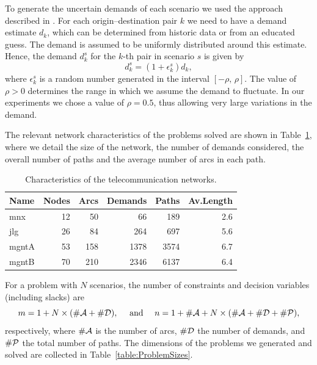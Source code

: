 To generate the uncertain demands of each scenario 
we used the approach described in \cite{Ouorou}. 
For each origin--destination pair $k$ we need to have a demand 
estimate $d_k$, which can be determined from historic data 
or from an educated guess. The demand is assumed to be uniformly 
distributed around this estimate. Hence, the demand $d_k^s$ 
for the $k$-th pair in scenario $s$ is given by
\[
d_k^s = (1+ \epsilon_k^s)d_k,
\]
where $\epsilon_k^s$ is a random number generated in the interval 
$[-\rho, \, \rho]$. The value of $\rho > 0$ determines the range 
in which we assume the demand to fluctuate.
In our experiments we chose a value of $\rho = 0.5$, thus allowing
very large variations in the demand.
%

The relevant network characteristics of the problems solved are shown 
in Table~\ref{table:ProblemData}, where we detail the size of the network, 
the number of demands considered, the overall number of paths and the
average number of arcs in each path.
%
%
%
\begin{table}[ht]
  \begin{center}
    \begin{tabular}{|l||r|r|r|r|r|} \hline
      Name      & Nodes & Arcs & Demands & Paths & Av.Length \\ \hline\hline
      mnx       &    12 &   50 &     66  &   189 & 2.6 \\
      jlg       &    26 &   84 &    264  &   697 & 5.6 \\
      mgntA     &    53 &  158 &   1378  &  3574 & 6.7 \\
      mgntB     &    70 &  210 &   2346  &  6137 & 6.4 \\ \hline
    \end{tabular}
    \caption{Characteristics of the telecommunication networks.}
    \label{table:ProblemData}
  \end{center} \vspace{-3ex}
\end{table}

\noindent For a problem with $N$ scenarios, the number of constraints and 
decision variables (including slacks) are
\[
m = 1 + N \times (\#{\cal A} + \#{\cal D}), \quad \mbox{ and } \quad
n = 1 + \#{\cal A} + N \times (\#{\cal A} + \#{\cal D} + \#{\cal P}),
\]
respectively, where $\#{\cal A}$ is the number of arcs, $\#{\cal D}$ 
the number of demands, and $\#{\cal P}$ the total number of paths.
The dimensions of the problems we generated and solved are
collected in Table~\ref{table:ProblemSizes}.

